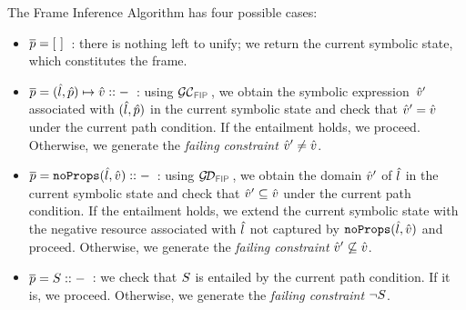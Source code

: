 \smallskip
The Frame Inference Algorithm has four possible cases: 
\begin{itemize}[leftmargin=*]
\setlength{\itemsep}{0.1cm}
\item  $\overline{p}=[ \ ]$~: there is nothing left to unify; we 
            return the current symbolic state, which constitutes the frame. 
   
   \item $\overline{p} = (\hat{l}, \hat{p}) \mapsto \hat{v} :: -$~:
            using $\GetCellVFun$, we obtain the symbolic expression~$\hat{v}'$
            associated with $(\hat{l}, \hat{p})$ in the current symbolic state and
            check that $\hat{v}' = \hat{v}$ under the current path condition. 
            If the entailment holds, we proceed. Otherwise, we generate
            the \emph{failing constraint} $\hat{v}' \neq \hat{v}$. 
  
   \item $\overline{p} = \texttt{noProps}(\hat{l}, \hat{v}) :: -$~:
            using $\GetDomainVFun$, we obtain the domain $\hat{v}'$
            of $\hat{l}$ in the current symbolic state and 
            check that $\hat{v}' \subseteq \hat{v}$ under the current path condition. 
            If the entailment holds, we extend the current symbolic state with the negative 
            resource associated with $\hat{l}$ not captured by $\texttt{noProps}(\hat{l}, \hat{v})$ and  proceed. 
            Otherwise, we generate the \emph{failing constraint} $\hat{v}' \not\subseteq \hat{v}$. 
            
   \item $\overline{p} = S :: -$~:  
            we check that $S$ is entailed by the current path condition. 
             If it is, we proceed. Otherwise, we generate
             the \emph{failing constraint} $\neg S$. 
\end{itemize}

